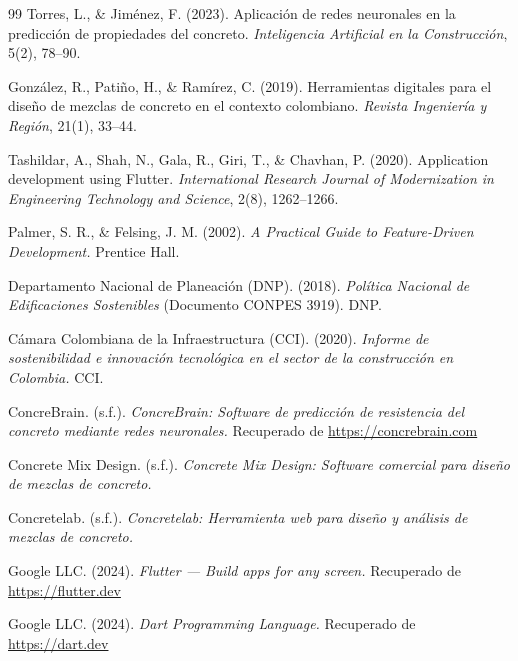 \begin{thebibliography}{99}
Torres, L., \& Jiménez, F. (2023).
Aplicación de redes neuronales en la predicción de propiedades del concreto.
\textit{Inteligencia Artificial en la Construcción}, 5(2), 78--90.

González, R., Patiño, H., \& Ramírez, C. (2019).
Herramientas digitales para el diseño de mezclas de concreto en el contexto colombiano.
\textit{Revista Ingeniería y Región}, 21(1), 33--44.

Tashildar, A., Shah, N., Gala, R., Giri, T., \& Chavhan, P. (2020).
Application development using Flutter.
\textit{International Research Journal of Modernization in Engineering Technology and Science}, 2(8), 1262--1266.

Palmer, S. R., \& Felsing, J. M. (2002).
\textit{A Practical Guide to Feature-Driven Development.}
Prentice Hall.


Departamento Nacional de Planeación (DNP). (2018).
\textit{Política Nacional de Edificaciones Sostenibles} (Documento CONPES 3919).
DNP.

Cámara Colombiana de la Infraestructura (CCI). (2020).
\textit{Informe de sostenibilidad e innovación tecnológica en el sector de la construcción en Colombia.}
CCI.


ConcreBrain. (s.f.). \textit{ConcreBrain: Software de predicción de resistencia del concreto mediante redes neuronales.} Recuperado de \url{https://concrebrain.com}

Concrete Mix Design. (s.f.). \textit{Concrete Mix Design: Software comercial para diseño de mezclas de concreto.}

Concretelab. (s.f.). \textit{Concretelab: Herramienta web para diseño y análisis de mezclas de concreto.}


Google LLC. (2024). \textit{Flutter — Build apps for any screen.} Recuperado de \url{https://flutter.dev}

Google LLC. (2024). \textit{Dart Programming Language.} Recuperado de \url{https://dart.dev}


\end{thebibliography}
